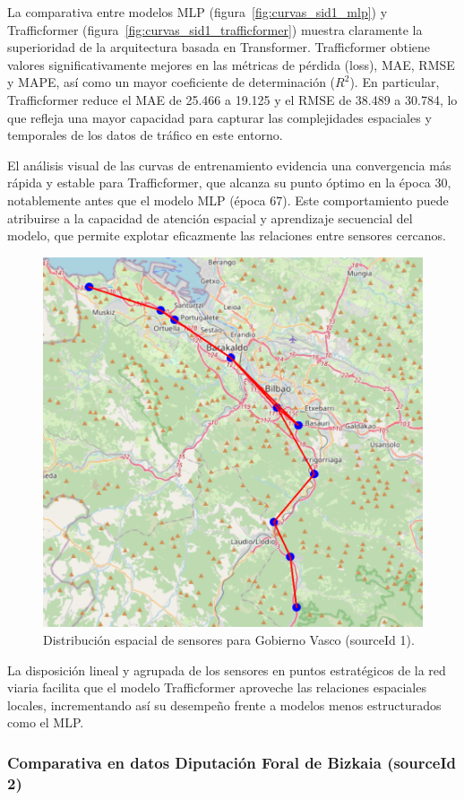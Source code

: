 La comparativa entre modelos MLP (figura~\ref{fig:curvas_sid1_mlp}) y Trafficformer (figura~\ref{fig:curvas_sid1_trafficformer}) muestra claramente la superioridad de la arquitectura basada en Transformer. Trafficformer obtiene valores significativamente mejores en las métricas de pérdida (loss), MAE, RMSE y MAPE, así como un mayor coeficiente de determinación ($R^2$). En particular, Trafficformer reduce el MAE de 25.466 a 19.125 y el RMSE de 38.489 a 30.784, lo que refleja una mayor capacidad para capturar las complejidades espaciales y temporales de los datos de tráfico en este entorno.

El análisis visual de las curvas de entrenamiento evidencia una convergencia más rápida y estable para Trafficformer, que alcanza su punto óptimo en la época 30, notablemente antes que el modelo MLP (época 67). Este comportamiento puede atribuirse a la capacidad de atención espacial y aprendizaje secuencial del modelo, que permite explotar eficazmente las relaciones entre sensores cercanos.

\begin{figure}[H]
	\centering
	\includegraphics[width=0.7\linewidth]{includes/cap5/source_id_1_meters_mask.png}
	\caption{Distribución espacial de sensores para Gobierno Vasco (sourceId 1).}
	\label{fig:sensores_sid1}
\end{figure}

La disposición lineal y agrupada de los sensores en puntos estratégicos de la red viaria facilita que el modelo Trafficformer aproveche las relaciones espaciales locales, incrementando así su desempeño frente a modelos menos estructurados como el MLP.

\subsubsection*{Comparativa en datos Diputación Foral de Bizkaia (sourceId 2)}

